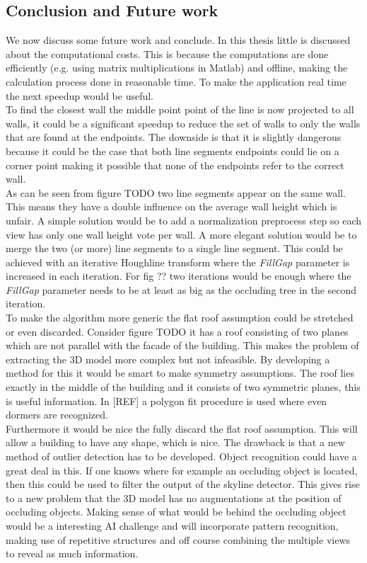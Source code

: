 \documentclass[10pt]{article}
\begin{document}
\subsection{Conclusion and Future work}
We now discuss some future work and conclude.  In this thesis little is discussed about the computational costs. This is because the computations are done efficiently (e.g. using matrix multiplications in Matlab) and offline, making the calculation process done in reasonable time. To make the application real time the next speedup would be useful.\\
To find the closest wall the middle point point of the line is now projected to all walls, it could be a significant speedup to reduce the set of walls to only the walls that are found at the endpoints. The downside is that it is slightly dangerous because it could be the case that both line segments endpoints could lie on a corner point making it possible that none of the endpoints refer to the correct wall.\\

As can be seen from figure TODO%
two line segments appear on the same wall. This means they have a double influence on the average wall height which is unfair. A simple solution would be to add a normalization preprocess step so each view has only one wall height vote per wall. A more elegant solution would be to merge the two (or more) line segments to a single line segment. This could be achieved with an iterative Houghline transform where the \emph{FillGap} parameter is increased in each iteration. For fig ?? %
two iterations would be enough where the \emph{FillGap} parameter needs to be at least as big as the occluding tree in the second iteration.\\
To make the algorithm more generic the flat roof assumption could be stretched or even discarded.
Consider figure TODO %
it has a roof consisting of two planes which are not parallel with the facade of the building. This makes the problem of extracting the 3D model more complex but not 
infeasible. By developing a method for this it would be smart to make symmetry assumptions. The roof lies exactly in the middle of the building and it consists of two symmetric planes, this is useful information. In 
[REF] a polygon fit procedure is used where even dormers are recognized.\\

Furthermore it would be nice the fully discard the flat roof assumption. This will allow a building to have any shape, which is nice. The drawback is that a new method of outlier detection has to be developed. Object recognition could have a great deal in this. If one knows where for example an occluding object is located, then this could be used to filter the output of the skyline detector. This gives rise to a new problem that the 3D model has no augmentations at the position of occluding objects. Making sense of what would be behind the occluding object would be a interesting AI challenge and will incorporate pattern recognition, making use of repetitive structures and off course combining the multiple views to reveal as much information.\\
\end{document}
